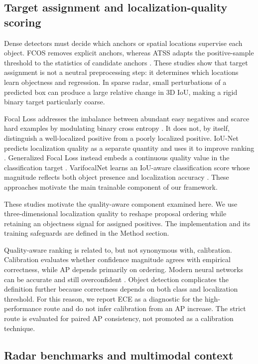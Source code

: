 \documentclass[preprint,12pt,times]{elsarticle}
\begin{document}
\subsection{Target assignment and localization-quality scoring}

Dense detectors must decide which anchors or spatial locations supervise each
object. FCOS removes explicit anchors, whereas ATSS adapts the positive-sample
threshold to the statistics of candidate anchors
\cite{tian2019fcos,zhang2020atss}. These studies show that target assignment is
not a neutral preprocessing step: it determines which locations learn
objectness and regression. In sparse radar, small perturbations of a predicted
box can produce a large relative change in 3D IoU, making a rigid binary target
particularly coarse.

Focal Loss addresses the imbalance between abundant easy negatives and scarce
hard examples by modulating binary cross entropy
\cite{lin2017focal}. It does not, by itself, distinguish a well-localized
positive from a poorly localized positive. IoU-Net predicts localization
quality as a separate quantity and uses it to improve ranking
\cite{jiang2018iounet}. Generalized Focal Loss instead embeds a continuous
quality value in the classification target \cite{li2022gfl}. VarifocalNet
learns an IoU-aware classification score whose magnitude reflects both object
presence and localization accuracy \cite{zhang2021varifocalnet}. These
approaches motivate the main trainable component of our framework.

These studies motivate the quality-aware component examined here. We use
three-dimensional localization quality to reshape proposal ordering while
retaining an objectness signal for assigned positives. The implementation and
its training safeguards are defined in the Method section.

Quality-aware ranking is related to, but not synonymous with, calibration.
Calibration evaluates whether confidence magnitude agrees with empirical
correctness, while AP depends primarily on ordering. Modern neural networks
can be accurate and still overconfident \cite{guo2017calibration}. Object
detection complicates the definition further because correctness depends on
both class and localization threshold. For this reason, we report ECE as a
diagnostic for the high-performance route and do not infer calibration from an
AP increase. The strict route is evaluated for paired AP consistency,
not promoted as a calibration technique.

\subsection{Radar benchmarks and multimodal context}
\end{document}
